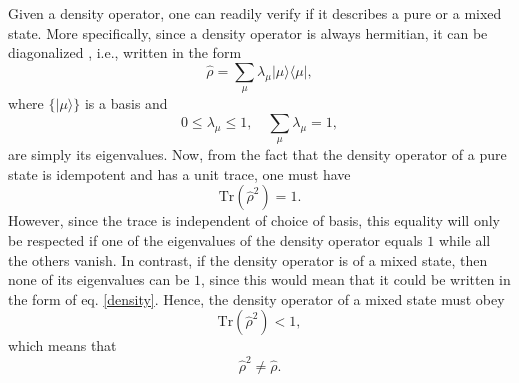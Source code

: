 \documentclass[
12pt,		%
openright,	%
twoside,  %
a4paper,			%
chapter=TITLE,		%
english,			%
french,				%
spanish,			%
brazil				%
]{USPSC-classe/USPSC}
\begin{document}
\begin{apendicesenv}
Given a density operator, one can readily verify if it describes a pure or a mixed state. More specifically, since a density operator is always hermitian, it can be diagonalized \cite{Sakurai1994}, i.e., written in the form 
\begin{equation}\label{eq30}
    \hat{\rho}=\sum_{\mu}\lambda_{\mu}|{\mu}\rangle\langle{\mu}|,
\end{equation}
where $\{|{\mu}\rangle\}$ is a basis and
\begin{equation}\label{diagrelation}
    0\leq\lambda_{\mu}\leq1,\quad \sum_{\mu}\lambda_{\mu}=1,
\end{equation}
are simply its eigenvalues. Now, from the fact that the density operator of a pure state is idempotent and has a unit trace, one must have 
\begin{equation}\label{tracepure}
    \text{Tr}(\hat{\rho}^2)=1.
\end{equation}
However, since the trace is independent of choice of basis, this equality will only be respected if one of the eigenvalues of the density operator equals $1$ while all the others vanish. In contrast, if the density operator is of a mixed state, then none of its eigenvalues can be $1$, since this would mean that it could be written in the form of eq. \ref{density}. Hence, the density operator of a mixed state must obey 
\begin{equation}
    \text{Tr}(\hat{\rho}^2)<1,
\end{equation}
which means that 
\begin{equation}
     \hat{\rho}^2\neq\hat{\rho}.
\end{equation}


\end{apendicesenv}
\end{document}
